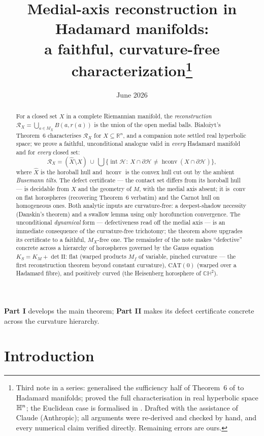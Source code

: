\documentclass[11pt]{article}
\title{Medial-axis reconstruction in Hadamard manifolds:\\
a faithful, curvature-free characterization\thanks{Third note in a
series: \cite{R1} generalised the sufficiency half of Theorem~6 of
\cite{Bia} to Hadamard manifolds; \cite{R2} proved the full
characterisation in real hyperbolic space $\mathbb{H}^{n}$; the Euclidean
case is formalised in \cite{Notes}. Drafted with the assistance of
Claude (Anthropic); all arguments were re-derived and checked by hand,
and every numerical claim verified directly. Remaining errors are
ours.}}
\author{}
\date{June 2026}
\theoremstyle{remark}
\newcommand{\R}{\mathbb{R}}
\newcommand{\X}{X}
\newcommand{\Xhat}{\widehat{\X}}
\newcommand{\Mx}{M_{\X}}
\newcommand{\Rx}{\mathcal{R}_{\X}}
\newcommand{\Hb}[1]{\mathcal{H}_{#1}}
\newcommand{\conv}{\operatorname{conv}}
\newcommand{\hconv}{\operatorname{hconv}}
\newcommand{\Mf}{M_{f}}
\begin{document}
\maketitle

\begin{abstract}
For a closed set $X$ in a complete Riemannian manifold, the
\emph{reconstruction} $\Rx=\bigcup_{a\in\Mx}B(a,r(a))$ is the union of
the open medial balls. Bia\l{}o\.zyt's Theorem~6 characterises $\Rx$
for $X\subseteq\R^{n}$, and a companion note settled real hyperbolic
space; we prove a faithful, unconditional analogue valid in
\emph{every} Hadamard manifold and for \emph{every} closed set:
\[
  \Rx=(\Xhat\setminus X)\ \cup\
  \bigcup\bigl\{\operatorname{int}\Hb{}:\ X\cap\partial\Hb{}\neq
  \hconv(X\cap\partial\Hb{})\bigr\},
\]
where $\Xhat$ is the horoball hull and $\hconv$ is the convex hull cut
out by the ambient \emph{Busemann tilts}. The defect certificate ---
the contact set differs from its horoball hull --- is decidable from
$X$ and the geometry of $M$, with the medial axis absent; it is
$\conv$ on flat horospheres (recovering Theorem~6 verbatim) and the
Carnot hull on homogeneous ones. Both analytic inputs are
curvature-free: a deepest-shadow necessity (Danskin's theorem) and a
swallow lemma using only horofunction convergence. The unconditional
\emph{dynamical} form --- defectiveness read off the medial axis ---
is an immediate consequence of the curvature-free trichotomy; the
theorem above upgrades its certificate to a faithful, $\Mx$-free one.
The remainder of the note makes ``defective'' concrete across a
hierarchy of horospheres governed by the Gauss equation
$K_{S}=K_{M}+\det\mathrm{II}$: flat (warped products $\Mf$ of variable,
pinched curvature --- the first reconstruction theorem beyond constant
curvature), $\mathrm{CAT}(0)$ (warped over a Hadamard fibre), and
positively curved (the Heisenberg horosphere of $\mathbb{CH}^{2}$).
\end{abstract}

\tableofcontents

\bigskip
\noindent\textbf{Part I} develops the main theorem; \textbf{Part II}
makes its defect certificate concrete across the curvature hierarchy.

\section{Introduction}\label{sec:intro}
\end{document}
